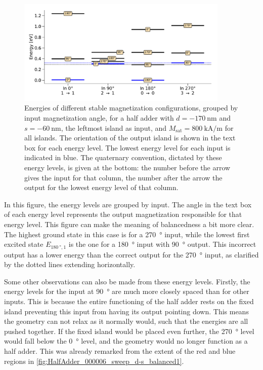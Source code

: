 \documentclass[11pt,a4paper,english,twoside]{article}
\begin{document}
\begin{figure}
    \centering
    \includegraphics[width=0.9\textwidth]{Figures/half_adder/energylevels/table(d170,s-60)_energylevels.pdf}
    \caption{Energies of different stable magnetization configurations, grouped by input magnetization angle, for a half adder with $d=\SI{-170}{\nano\metre}$ and $s=\SI{-60}{\nano\metre}$, the leftmost island as input, and $M_\mathrm{sat} = \SI{800}{\kilo\ampere\per\metre}$ for all islands. The orientation of the output island is shown in the text box for each energy level. The lowest energy level for each input is indicated in blue. The quaternary convention, dictated by these energy levels, is given at the bottom: the number before the arrow gives the input for that column, the number after the arrow the output for the lowest energy level of that column.}
    \label{fig:HalfAdder_000006_energylevels_d170_s-60}
\end{figure}
In this figure, the energy levels are grouped by input. The angle in the text box of each energy level represents the output magnetization responsible for that energy level. This figure can make the meaning of balancedness a bit more clear. The highest ground state in this case is for a \SI{270}{\degree} input, while the lowest first excited state $E_{\SI{180}{\degree}, 1}$ is the one for a \SI{180}{\degree} input with \SI{90}{\degree} output. This incorrect output has a lower energy than the correct output for the \SI{270}{\degree} input, as clarified by the dotted lines extending horizontally. \par
Some other observations can also be made from these energy levels. Firstly, the energy levels for the input at \SI{90}{\degree} are much more closely spaced than for other inputs. This is because the entire functioning of the half adder rests on the fixed island preventing this input from having its output pointing down. This means the geometry can not relax as it normally would, such that the energies are all pushed together. If the fixed island would be placed even further, the \SI{270}{\degree} level would fall below the \SI{0}{\degree} level, and the geometry would no longer function as a half adder. This was already remarked from the extent of the red and blue regions in \cref{fig:HalfAdder_000006_sweep_d-s_balanced1}.
\end{document}
